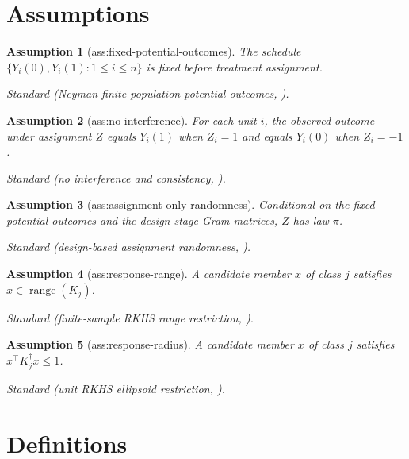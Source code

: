 \documentclass{article}
\newtheorem{assumption}{Assumption}
\begin{document}
\section{Assumptions}

\begin{assumption}[ass:fixed-potential-outcomes]\label{ass:fixed-potential-outcomes}
The schedule \(\{Y_i(0),Y_i(1):1\le i\le n\}\) is fixed before treatment assignment.
\par\smallskip\noindent\emph{Standard} (Neyman finite-population potential outcomes, \cite{Neyman1923}).
\end{assumption}

\begin{assumption}[ass:no-interference]\label{ass:no-interference}
For each unit \(i\), the observed outcome under assignment \(Z\) equals \(Y_i(1)\) when \(Z_i=1\) and equals \(Y_i(0)\) when \(Z_i=-1\).
\par\smallskip\noindent\emph{Standard} (no interference and consistency, \cite{Kallus2018OptimalBalance}).
\end{assumption}

\begin{assumption}[ass:assignment-only-randomness]\label{ass:assignment-only-randomness}
Conditional on the fixed potential outcomes and the design-stage Gram matrices, \(Z\) has law \(\pi\).
\par\smallskip\noindent\emph{Standard} (design-based assignment randomness, \cite{Kallus2021OptimalRandomization}).
\end{assumption}

\begin{assumption}[ass:response-range]\label{ass:response-range}
A candidate member \(x\) of class \(j\) satisfies \(x\in\operatorname{range}(K_j)\).
\par\smallskip\noindent\emph{Standard} (finite-sample RKHS range restriction, \cite{Kallus2018OptimalBalance}).
\end{assumption}

\begin{assumption}[ass:response-radius]\label{ass:response-radius}
A candidate member \(x\) of class \(j\) satisfies \(x^\top K_j^\dagger x\le1\).
\par\smallskip\noindent\emph{Standard} (unit RKHS ellipsoid restriction, \cite{Kallus2018OptimalBalance}).
\end{assumption}

\section{Definitions}
\end{document}
